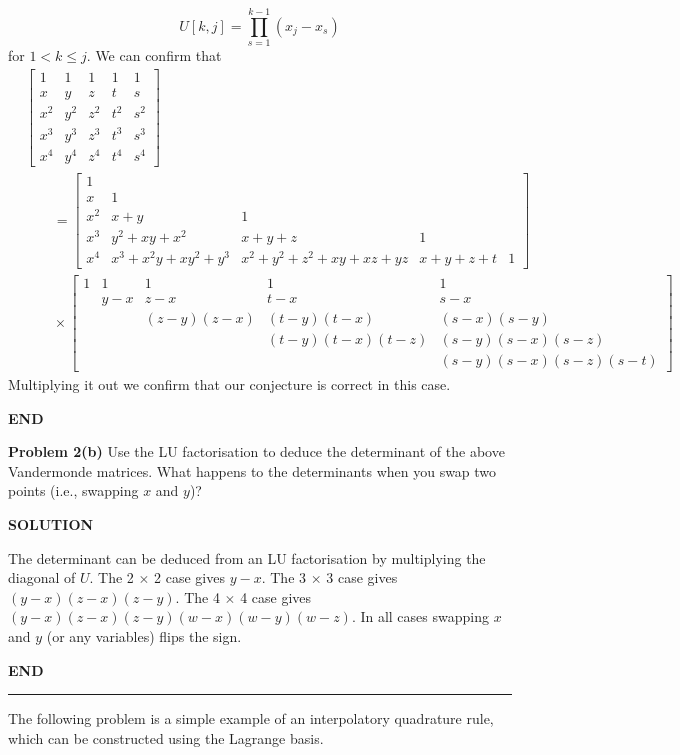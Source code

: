 \documentclass[12pt,a4paper]{article}
\begin{document}
\[
U[k,j] = \ensuremath{\prod}_{s = 1}^{k-1} (x_j-x_s)
\]
for $1 < k \ensuremath{\leq} j$. We can confirm that
\begin{align*}
&\begin{bmatrix}
1 & 1 & 1 & 1 & 1 \\
x & y & z & t & s\\
x^2 & y^2 & z^2 & t^2 & s^2 \\
x^3 & y^3 & z^3 & t^3 & s^3 \\
x^4 & y^4 & z^4 & t^4 & s^4
\end{bmatrix} \\
&\qquad =
\begin{bmatrix}
1 &  \\
x & 1 \\
x^2 & x+y  & 1 \\
x^3 &y^2 + xy + x^2  & x+ y + z & 1 \\
x^4 & x^3 + x^2 y + x y^2 + y^3 & x^2 + y^2 + z^2 + xy + xz + yz  & x + y + z + t & 1
\end{bmatrix} \\
&\qquad \ensuremath{\times}
\begin{bmatrix}
1 & 1 & 1 & 1 & 1\\
 & y-x & z-x & t-x & s-x  \\
 &  & (z-y)(z-x) & (t-y)(t-x) & (s-x) (s-y) \\
 &  &  & (t-y)(t-x)(t-z) &   (s-y)(s-x)(s-z)  \\
 &  &  &  &   (s-y)(s-x)(s-z)(s-t)
\end{bmatrix}
\end{align*}
Multiplying it out we confirm that our conjecture is correct in this case.

\textbf{END}

\textbf{Problem 2(b)} Use the LU factorisation to deduce the determinant of the above Vandermonde matrices. What happens to the determinants when you swap two points (i.e., swapping $x$ and $y$)?

\textbf{SOLUTION}

The determinant can be deduced from an LU factorisation by multiplying the diagonal of $U$. The  2 \ensuremath{\times} 2 case gives $y-x$. The 3 \ensuremath{\times} 3 case gives $(y-x) (z-x)(z-y)$. The 4 \ensuremath{\times} 4 case gives $(y-x)(z-x)(z-y)(w-x)(w-y)(w-z)$. In all cases swapping $x$ and $y$ (or any variables) flips the sign.

\textbf{END}

\rule{\textwidth}{1pt}
The following problem is a simple example of an interpolatory quadrature rule, which can be constructed using the Lagrange basis.
\end{document}

